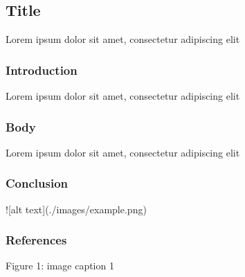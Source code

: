 \documentclass{article}
\begin{document}
\subsection*{Title}
Lorem ipsum dolor sit amet, consectetur adipiscing elit
\subsubsection*{Introduction}
Lorem ipsum dolor sit amet, consectetur adipiscing elit
\subsubsection*{Body}
Lorem ipsum dolor sit amet, consectetur adipiscing elit
\subsubsection*{Conclusion}
![alt text](./images/example.png)
\subsubsection*{References}
Figure 1: image caption 1
\end{document}
